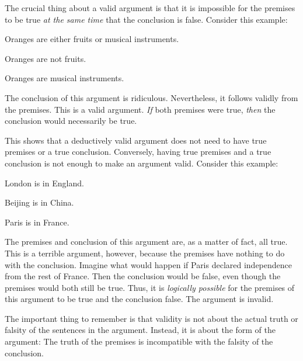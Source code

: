 The crucial thing about a valid argument is that it is impossible for the premises to be true \emph{at the same time} that the conclusion is false. Consider this example:

\begin{earg}
\item[] Oranges are either fruits or musical instruments.
\item[] Oranges are not fruits.
\item[\therefore] Oranges are musical instruments.
\end{earg}

The conclusion of this argument is ridiculous. Nevertheless, it follows validly from the premises. This is a valid argument. \emph{If} both premises were true, \emph{then} the conclusion would necessarily be true.

This shows that a deductively valid argument does not need to have true premises or a true conclusion. Conversely, having true premises and a true conclusion is not enough to make an argument valid. Consider this example:

\begin{earg}
\item[] London is in England.
\item[] Beijing is in China.
\item[\therefore] Paris is in France.
\end{earg}


The premises and conclusion of this argument are, as a matter of fact, all true. This is a terrible argument, however, because the premises have nothing to do with the conclusion. Imagine what would happen if Paris declared independence from the rest of France. Then the conclusion would be false, even though the premises would both still be true. Thus, it is \emph{logically possible} for the premises of this argument to be true and the conclusion false. The argument is invalid.

The important thing to remember is that validity is not about the actual truth or falsity of the sentences in the argument. Instead, it is about the form of the argument: The truth of the premises is incompatible with the falsity of the conclusion.




